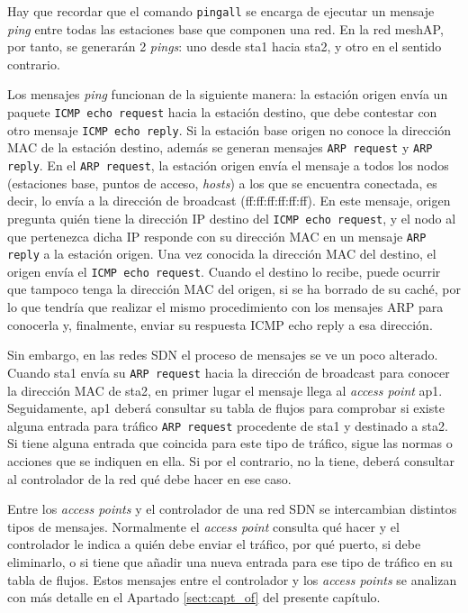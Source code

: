 \documentclass[a4paper,12pt,twoside,spanish]{book}
\begin{document}
Hay que recordar que el comando \texttt{pingall} se encarga de ejecutar un mensaje \textit{ping} entre todas las estaciones base que componen una red. En la red meshAP, por tanto, se generarán 2 \textit{pings}: uno desde sta1 hacia sta2, y otro en el sentido contrario.\par

Los mensajes \textit{ping} funcionan de la siguiente manera: la estación origen envía un paquete \texttt{ICMP echo request} hacia la estación destino, que debe contestar con otro mensaje \texttt{ICMP echo reply}. Si la estación base origen no conoce la dirección MAC de la estación destino, además se generan mensajes \texttt{ARP request} y \texttt{ARP reply}. En el \texttt{ARP request}, la estación origen envía el mensaje a todos los nodos (estaciones base, puntos de acceso, \textit{hosts}) a los que se encuentra conectada, es decir, lo envía a la dirección de broadcast (ff:ff:ff:ff:ff:ff). En este mensaje, origen pregunta quién tiene la dirección IP destino del \texttt{ICMP echo request}, y el nodo al que pertenezca dicha IP responde con su dirección MAC en un mensaje \texttt{ARP reply} a la estación origen. Una vez conocida la dirección MAC del destino, el origen envía el \texttt{ICMP echo request}. Cuando el destino lo recibe, puede ocurrir que tampoco tenga la dirección MAC del origen, si se ha borrado de su caché, por lo que tendría que realizar el mismo procedimiento con los mensajes ARP para conocerla y, finalmente, enviar su respuesta ICMP echo reply a esa dirección.\par

Sin embargo, en las redes SDN el proceso de mensajes se ve un poco alterado. Cuando sta1 envía su \texttt{ARP request} hacia la dirección de broadcast para conocer la dirección MAC de sta2, en primer lugar el mensaje llega al \textit{access point} ap1. Seguidamente, ap1 deberá consultar su tabla de flujos para comprobar si existe alguna entrada para tráfico \texttt{ARP request} procedente de sta1 y destinado a sta2. Si tiene alguna entrada que coincida para este tipo de tráfico, sigue las normas o acciones que se indiquen en ella. Si por el contrario, no la tiene, deberá consultar al controlador de la red qué debe hacer en ese caso.\par 

Entre los \textit{access points} y el controlador de una red SDN se intercambian distintos tipos de mensajes. Normalmente el \textit{access point} consulta qué hacer y el controlador le indica a quién debe enviar el tráfico, por qué puerto, si debe eliminarlo, o si tiene que añadir una nueva entrada para ese tipo de tráfico en su tabla de flujos. Estos mensajes entre el controlador y los \textit{access points} se analizan con más detalle en el Apartado \ref{sect:capt_of} del presente capítulo.\par 
\end{document}
